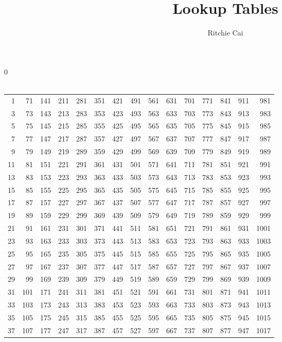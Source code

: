 \documentclass{assignment}
\title{Lookup Tables}
\author{Ritchie Cai}
\begin{document}
0\\
\\

\begin{tabular}{r r r r r r r r r r r r r r r}
1 & 71 & 141 & 211 & 281 & 351 & 421 & 491 & 561 & 631 & 701 & 771 & 841 & 911 & 981 \\
3 & 73 & 143 & 213 & 283 & 353 & 423 & 493 & 563 & 633 & 703 & 773 & 843 & 913 & 983 \\
5 & 75 & 145 & 215 & 285 & 355 & 425 & 495 & 565 & 635 & 705 & 775 & 845 & 915 & 985 \\
7 & 77 & 147 & 217 & 287 & 357 & 427 & 497 & 567 & 637 & 707 & 777 & 847 & 917 & 987 \\
9 & 79 & 149 & 219 & 289 & 359 & 429 & 499 & 569 & 639 & 709 & 779 & 849 & 919 & 989 \\
11 & 81 & 151 & 221 & 291 & 361 & 431 & 501 & 571 & 641 & 711 & 781 & 851 & 921 & 991 \\
13 & 83 & 153 & 223 & 293 & 363 & 433 & 503 & 573 & 643 & 713 & 783 & 853 & 923 & 993 \\
15 & 85 & 155 & 225 & 295 & 365 & 435 & 505 & 575 & 645 & 715 & 785 & 855 & 925 & 995 \\
17 & 87 & 157 & 227 & 297 & 367 & 437 & 507 & 577 & 647 & 717 & 787 & 857 & 927 & 997 \\
19 & 89 & 159 & 229 & 299 & 369 & 439 & 509 & 579 & 649 & 719 & 789 & 859 & 929 & 999 \\
21 & 91 & 161 & 231 & 301 & 371 & 441 & 511 & 581 & 651 & 721 & 791 & 861 & 931 & 1001 \\
23 & 93 & 163 & 233 & 303 & 373 & 443 & 513 & 583 & 653 & 723 & 793 & 863 & 933 & 1003 \\
25 & 95 & 165 & 235 & 305 & 375 & 445 & 515 & 585 & 655 & 725 & 795 & 865 & 935 & 1005 \\
27 & 97 & 167 & 237 & 307 & 377 & 447 & 517 & 587 & 657 & 727 & 797 & 867 & 937 & 1007 \\
29 & 99 & 169 & 239 & 309 & 379 & 449 & 519 & 589 & 659 & 729 & 799 & 869 & 939 & 1009 \\
31 & 101 & 171 & 241 & 311 & 381 & 451 & 521 & 591 & 661 & 731 & 801 & 871 & 941 & 1011 \\
33 & 103 & 173 & 243 & 313 & 383 & 453 & 523 & 593 & 663 & 733 & 803 & 873 & 943 & 1013 \\
35 & 105 & 175 & 245 & 315 & 385 & 455 & 525 & 595 & 665 & 735 & 805 & 875 & 945 & 1015 \\
37 & 107 & 177 & 247 & 317 & 387 & 457 & 527 & 597 & 667 & 737 & 807 & 877 & 947 & 1017 \\

\end{tabular}
\end{document}
